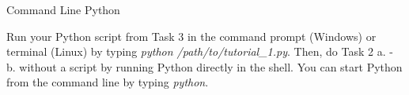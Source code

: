 \documentclass[twoside]{article}
\begin{document}
\begin{task}{Command Line Python}{}{}

    Run your Python script from Task 3 in the command prompt (Windows) or terminal (Linux) by typing \textit{python /path/to/tutorial\_1.py}.
    Then, do Task 2 a. - b. without a script by running Python directly in the shell.
    You can start Python from the command line by typing \textit{python}.

\end{task}
\end{document}
